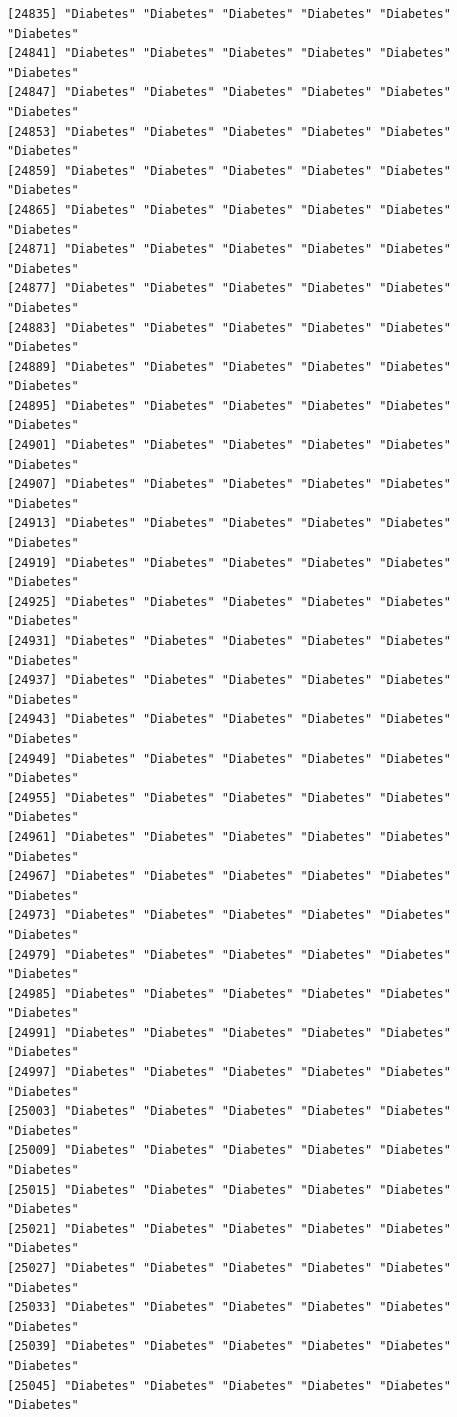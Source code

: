 \documentclass[
  letterpaper,
  DIV=11,
  numbers=noendperiod]{scrartcl}
\begin{document}
\begin{verbatim}
[24835] "Diabetes" "Diabetes" "Diabetes" "Diabetes" "Diabetes" "Diabetes"
[24841] "Diabetes" "Diabetes" "Diabetes" "Diabetes" "Diabetes" "Diabetes"
[24847] "Diabetes" "Diabetes" "Diabetes" "Diabetes" "Diabetes" "Diabetes"
[24853] "Diabetes" "Diabetes" "Diabetes" "Diabetes" "Diabetes" "Diabetes"
[24859] "Diabetes" "Diabetes" "Diabetes" "Diabetes" "Diabetes" "Diabetes"
[24865] "Diabetes" "Diabetes" "Diabetes" "Diabetes" "Diabetes" "Diabetes"
[24871] "Diabetes" "Diabetes" "Diabetes" "Diabetes" "Diabetes" "Diabetes"
[24877] "Diabetes" "Diabetes" "Diabetes" "Diabetes" "Diabetes" "Diabetes"
[24883] "Diabetes" "Diabetes" "Diabetes" "Diabetes" "Diabetes" "Diabetes"
[24889] "Diabetes" "Diabetes" "Diabetes" "Diabetes" "Diabetes" "Diabetes"
[24895] "Diabetes" "Diabetes" "Diabetes" "Diabetes" "Diabetes" "Diabetes"
[24901] "Diabetes" "Diabetes" "Diabetes" "Diabetes" "Diabetes" "Diabetes"
[24907] "Diabetes" "Diabetes" "Diabetes" "Diabetes" "Diabetes" "Diabetes"
[24913] "Diabetes" "Diabetes" "Diabetes" "Diabetes" "Diabetes" "Diabetes"
[24919] "Diabetes" "Diabetes" "Diabetes" "Diabetes" "Diabetes" "Diabetes"
[24925] "Diabetes" "Diabetes" "Diabetes" "Diabetes" "Diabetes" "Diabetes"
[24931] "Diabetes" "Diabetes" "Diabetes" "Diabetes" "Diabetes" "Diabetes"
[24937] "Diabetes" "Diabetes" "Diabetes" "Diabetes" "Diabetes" "Diabetes"
[24943] "Diabetes" "Diabetes" "Diabetes" "Diabetes" "Diabetes" "Diabetes"
[24949] "Diabetes" "Diabetes" "Diabetes" "Diabetes" "Diabetes" "Diabetes"
[24955] "Diabetes" "Diabetes" "Diabetes" "Diabetes" "Diabetes" "Diabetes"
[24961] "Diabetes" "Diabetes" "Diabetes" "Diabetes" "Diabetes" "Diabetes"
[24967] "Diabetes" "Diabetes" "Diabetes" "Diabetes" "Diabetes" "Diabetes"
[24973] "Diabetes" "Diabetes" "Diabetes" "Diabetes" "Diabetes" "Diabetes"
[24979] "Diabetes" "Diabetes" "Diabetes" "Diabetes" "Diabetes" "Diabetes"
[24985] "Diabetes" "Diabetes" "Diabetes" "Diabetes" "Diabetes" "Diabetes"
[24991] "Diabetes" "Diabetes" "Diabetes" "Diabetes" "Diabetes" "Diabetes"
[24997] "Diabetes" "Diabetes" "Diabetes" "Diabetes" "Diabetes" "Diabetes"
[25003] "Diabetes" "Diabetes" "Diabetes" "Diabetes" "Diabetes" "Diabetes"
[25009] "Diabetes" "Diabetes" "Diabetes" "Diabetes" "Diabetes" "Diabetes"
[25015] "Diabetes" "Diabetes" "Diabetes" "Diabetes" "Diabetes" "Diabetes"
[25021] "Diabetes" "Diabetes" "Diabetes" "Diabetes" "Diabetes" "Diabetes"
[25027] "Diabetes" "Diabetes" "Diabetes" "Diabetes" "Diabetes" "Diabetes"
[25033] "Diabetes" "Diabetes" "Diabetes" "Diabetes" "Diabetes" "Diabetes"
[25039] "Diabetes" "Diabetes" "Diabetes" "Diabetes" "Diabetes" "Diabetes"
[25045] "Diabetes" "Diabetes" "Diabetes" "Diabetes" "Diabetes" "Diabetes"

\end{verbatim}
\end{document}
